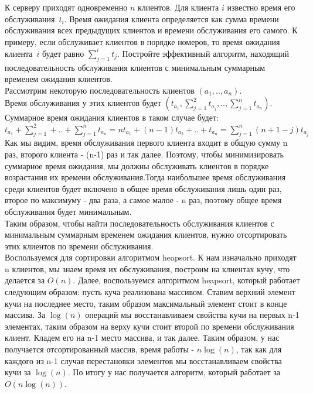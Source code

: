 \documentclass[12pt]{extreport}
\theoremstyle{definiton}
\theoremstyle{definition}
\theoremstyle{definition}
\begin{document}
			\Pr[4][5.32 ДПВ] К серверу приходят одновременно $n$ клиентов. Для клиента $i$ известно время его обслуживания~$t_i$. Время ожидания клиента определяется как сумма времени обслуживания всех предыдущих клиентов и времени обслуживания его самого. К примеру, если обслуживает клиентов в порядке номеров, то время ожидания клиента~$i$ будет равно $\sum\limits_{j=1}^{i} t_j$. Постройте эффективный алгоритм, находящий последовательность обслуживания клиентов с минимальным суммарным временем ожидания клиентов.
			\newline
			\\ Рассмотрим некоторую последовательность клиентов $(a_1,..,a_n)$.
			\\ Время обслуживания у этих клиентов будет $(t_{a_1}, \sum\limits_{j=1}^{2} t_{a_j},..,\sum\limits_{j=1}^{n}t_{a_n})$.
			\\Суммарное время ожидания клиентов в таком случае будет: $t_{a_1} + \sum\limits_{j=1}^{2}+..+\sum\limits_{j=1}^{n}t_{a_n}=nt_{a_1}+(n-1)t_{a_2}+..+t_{a_n}=\sum\limits_{j=1}^{n}(n+1-j)t_{a_j}$
			\\ Как мы видим, время обслуживания первого клиента входит в общую сумму n раз, второго клиента - (n-1) раз и так далее. Поэтому, чтобы минимизировать суммарное время ожидания, мы должны обслуживать клиентов в порядке возрастания их времени обслуживания.Тогда наибольшее время обслуживания среди клиентов будет включено в общее время обслуживания лишь один раз, второе по максимуму - два раза, а самое малое - n раз, поэтому общее время обслуживания будет минимальным.
			\\Таким образом, чтобы найти последовательность обслуживания клиентов с минимальным суммарным временем ожидания клиентов, нужно отсортировать этих клиентов по времени обслуживания.
			\\Воспользуемся для сортировки алгоритмом heapsort. К нам изначально приходят n клиентов, мы знаем время их обслуживания, построим на клиентах кучу, что делается за $O(n)$. Далее, воспользуемся алгоритмом heapsort, который работает следующим образом: пусть куча реализована массивом. Ставим верхний элемент кучи на последнее место, таким образом максимальный элемент стоит в конце массива. За $\log(n)$ операций мы восстанавливаем свойства кучи на первых n-1 элементах, таким образом на верху кучи стоит второй по времени обслуживания клиент. Кладем его на n-1 место массива, и так далее. Таким образом, у нас получается отсортированный массив, время работы - $n\log(n)$, так как для каждого из n-1 случая перестановки элементов мы восстанавливаем свойства кучи за $\log(n)$. По итогу у нас получается алгоритм, который работает за $O(n\log(n))$.



			
			
			
\end{document}
